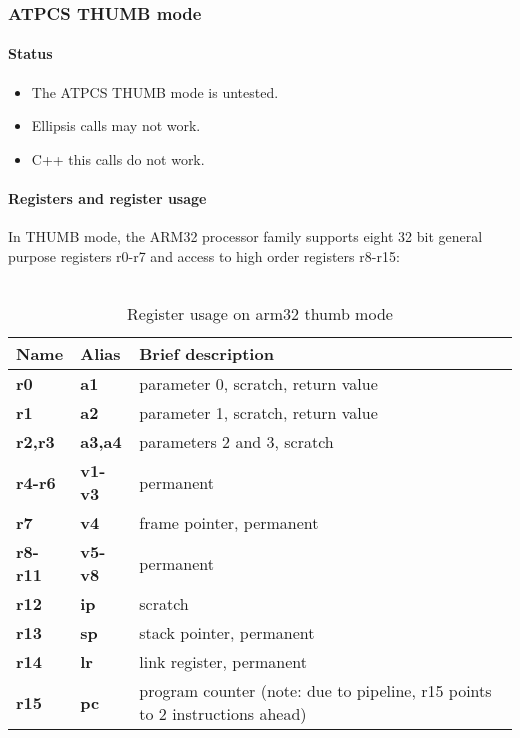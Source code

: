 \newpage


\subsubsection{ATPCS THUMB mode}


\paragraph{Status}

\begin{itemize}
\item The ATPCS THUMB mode is untested.
\item Ellipsis calls may not work.
\item C++ this calls do not work.
\end{itemize}

\paragraph{Registers and register usage}

In THUMB mode, the ARM32 processor family supports eight 32 bit general purpose registers r0-r7 and access to high order registers r8-r15:\\
\\
\begin{table}[h]
\begin{tabular*}{0.95\textwidth}{lll}
Name         & Alias       & Brief description\\
\hline
{\bf r0}     & {\bf a1}    & parameter 0, scratch, return value\\
{\bf r1}     & {\bf a2}    & parameter 1, scratch, return value\\
{\bf r2,r3}  & {\bf a3,a4} & parameters 2 and 3, scratch\\
{\bf r4-r6}  & {\bf v1-v3} & permanent\\
{\bf r7}     & {\bf v4}    & frame pointer, permanent\\
{\bf r8-r11} & {\bf v5-v8} & permanent\\
{\bf r12}    & {\bf ip}    & scratch\\
{\bf r13}    & {\bf sp}    & stack pointer, permanent\\
{\bf r14}    & {\bf lr}    & link register, permanent\\
{\bf r15}    & {\bf pc}    & program counter (note: due to pipeline, r15 points to 2 instructions ahead)\\
\end{tabular*}
\caption{Register usage on arm32 thumb mode}
\end{table}


